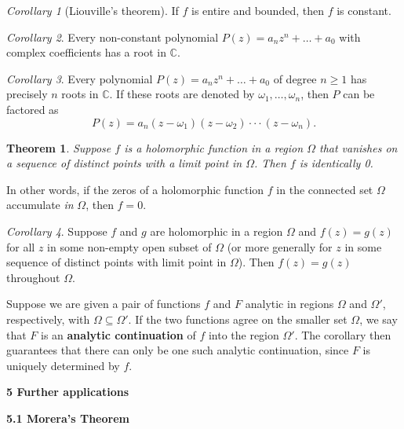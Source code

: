 \documentclass{article}
\newtheorem{theorem}{Theorem}
\theoremstyle{definition}
\theoremstyle{remark}
\newtheorem{corollary}{Corollary}[theorem]
\begin{document}
    \begin{corollary}[Liouville's theorem]
        If $f$ is entire and bounded, then $f$ is constant.
    \end{corollary}

    \begin{corollary}
        Every non-constant polynomial $P(z) = a_nz^n + \hdots + a_0$ with complex coefficients has a root in $\mathbb{C}$.
    \end{corollary}

    \begin{corollary}
        Every polynomial $P(z) = a_nz^n + \hdots + a_0$ of degree $n\geq 1$ has precisely $n$ roots in $\mathbb{C}$. If these roots
        are denoted by $\omega_1,\hdots,\omega_n$, then $P$ can be factored as
        \[ P(z) = a_n(z-\omega_1)(z-\omega_2)\cdot\cdot\cdot(z-\omega_n). \]
    \end{corollary}

    \begin{theorem}
        Suppose $f$ is a holomorphic function in a region $\Omega$ that vanishes on a sequence of distinct points with a limit point
        in $\Omega$. Then $f$ is identically 0.
    \end{theorem}

    In other words, if the zeros of a holomorphic function $f$ in the connected set $\Omega$ accumulate \textit{in} $\Omega$, then
    $f = 0$.

    \begin{corollary}
        Suppose $f$ and $g$ are holomorphic in a region $\Omega$ and $f(z) = g(z)$ for all $z$ in some non-empty open subset of 
        $\Omega$ (or more generally for $z$ in some sequence of distinct points with limit point in $\Omega$). Then $f(z)=g(z)$
        throughout $\Omega$.
    \end{corollary}

    Suppose we are given a pair of functions $f$ and $F$ analytic in regions $\Omega$ and $\Omega'$, respectively, with 
    $\Omega\subseteq\Omega'$. If the two functions agree on the smaller set $\Omega$, we say that $F$ is an 
    \textbf{analytic continuation} of $f$ into the region $\Omega'$. The corollary then guarantees that there can only be one such
    analytic continuation, since $F$ is uniquely determined by $f$.

    \newpage

    \textbf{5 Further applications}

    \textbf{5.1 Morera's Theorem}
\end{document}
